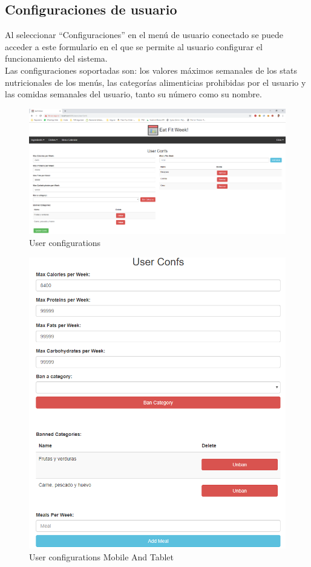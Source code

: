 \documentclass[12pt, a4paper, twoside]{book}
\begin{document}
	\subsection{Configuraciones de usuario}
	Al seleccionar ``Configuraciones'' en el menú de usuario conectado se puede acceder a este formulario en el que se permite al usuario configurar el funcionamiento del sistema.\\
	Las configuraciones soportadas son: los valores máximos semanales de los stats nutricionales de los menús, las categorías alimenticias prohibidas por el usuario y las comidas semanales del usuario, tanto su número como su nombre.
	\begin{figure}[H]
		\centering
		\includegraphics[width=15cm]{Imagenes/MU-UserConfs.png}
		\caption{User configurations}\label{User configurations}
	\end{figure}
	\begin{figure}[H]
		\centering
		\includegraphics[width=15cm]{Imagenes/MU-UserConfsMobileTablet.png}
		\caption{User configurations Mobile And Tablet}\label{User configurations Mobile And Tablet}
	\end{figure}
\end{document}
